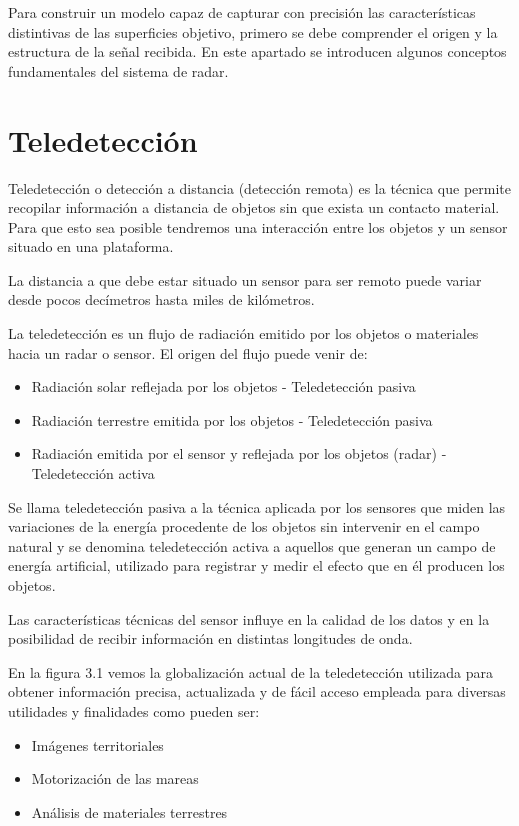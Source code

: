 
Para construir un modelo capaz de capturar con precisión las características distintivas de las superficies objetivo, primero se debe comprender el origen y la estructura de la señal recibida. En este apartado se introducen algunos conceptos fundamentales del sistema de radar.
\section{Teledetección}

Teledetección o detección a distancia (detección remota) es la técnica que permite recopilar información a distancia de objetos sin que exista un contacto material. Para que esto sea posible tendremos una interacción entre los objetos y un sensor situado en una plataforma.

La distancia a que debe estar situado un sensor para ser remoto puede variar desde pocos decímetros hasta miles de kilómetros.

La teledetección es un flujo de radiación emitido por los objetos o materiales hacia un radar o sensor. El origen del flujo puede venir de:

\begin{itemize}
\item Radiación solar reflejada por los objetos - Teledetección pasiva
\item Radiación terrestre emitida por los objetos - Teledetección pasiva
\item Radiación emitida por el sensor y reflejada por los objetos (radar) - Teledetección activa
\end{itemize}

Se llama teledetección pasiva a la técnica aplicada por los sensores que miden las variaciones de la energía procedente de los objetos sin intervenir en el campo natural y se denomina teledetección activa a aquellos que generan un campo de energía artificial, utilizado para registrar y medir el efecto que en él producen los objetos.
 
Las características técnicas del sensor influye en la calidad de los datos y en la posibilidad de recibir información en distintas longitudes de onda. 


En la figura 3.1 vemos la globalización actual de la teledetección utilizada para obtener información precisa, actualizada y de fácil acceso empleada para diversas utilidades y finalidades como pueden ser:
\begin{itemize}
\item Imágenes territoriales
\item Motorización de las mareas
\item Análisis de materiales terrestres
\end{itemize}

